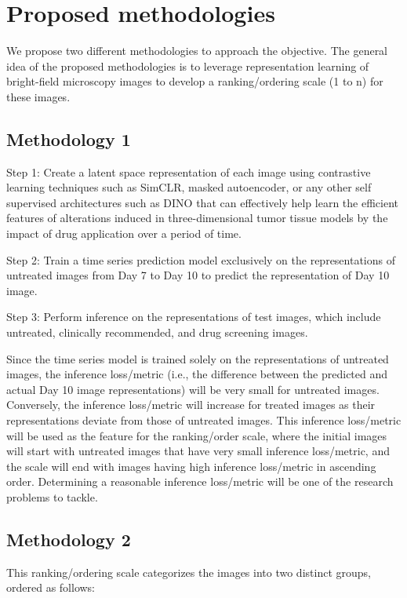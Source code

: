 \documentclass[12pt,twoside,a4paper,parskip]{scrbook} %
\begin{document}
\let\cleardoublepage\clearpage
\chapter{Proposed methodologies}\label{ch:Proposed methodologies}
We propose two different methodologies to approach the objective. The general idea of the proposed methodologies is to leverage representation learning of bright-field microscopy images to develop a ranking/ordering scale (1 to n) for these images. 

\section{Methodology 1}
Step 1: Create a latent space representation of each image using contrastive learning techniques such as SimCLR, masked autoencoder, or any other self supervised architectures such as DINO that can effectively help learn the efficient features of alterations induced in three-dimensional tumor tissue models by the impact of drug application over a period of time.

Step 2: Train a time series prediction model exclusively on the representations of untreated images from Day 7 to Day 10 to predict the representation of Day 10 image.

Step 3: Perform inference on the representations of test images, which include untreated, clinically recommended, and drug screening images.

Since the time series model is trained solely on the representations of untreated images, the inference loss/metric (i.e., the difference between the predicted and actual Day 10 image representations) will be very small for untreated images. Conversely, the inference loss/metric will increase for treated images as their representations deviate from those of untreated images. This inference loss/metric will be used as the feature for the ranking/order scale, where the initial images will start with untreated images that have very small inference loss/metric, and the scale will end with images having high inference loss/metric in ascending order. Determining a reasonable inference loss/metric will be one of the research problems to tackle.
\section{Methodology 2}

This ranking/ordering scale categorizes the images into two distinct groups, ordered as follows:
\end{document}
